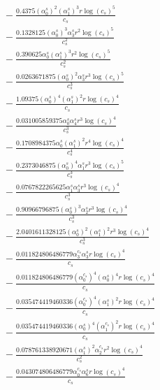 \documentclass[10pt]{article}
\begin{document}
\begin{align*}
&{}  - \frac{0.4375 \left(\alpha_{0}^s\right)^{2} \left(\alpha_{1}^s\right)^{3} r \log{\left(c_{s} \right)}^{5}}{c_{s}} \\
&{}  - \frac{0.1328125 \left(\alpha_{0}^s\right)^{3} \alpha_{3}^s r^{2} \log{\left(c_{s} \right)}^{5}}{c_{s}^{2}} \\
&{}  - \frac{0.390625 \alpha_{0}^s \left(\alpha_{1}^s\right)^{3} r^{2} \log{\left(c_{s} \right)}^{5}}{c_{s}^{2}} \\
&{}  - \frac{0.0263671875 \left(\alpha_{0}^s\right)^{2} \alpha_{3}^s r^{3} \log{\left(c_{s} \right)}^{5}}{c_{s}^{3}} \\
&{}  - \frac{1.09375 \left(\alpha_{0}^s\right)^{4} \left(\alpha_{1}^s\right)^{2} r \log{\left(c_{s} \right)}^{4}}{c_{s}} \\
&{}  - \frac{0.031005859375 \alpha_{0}^s \alpha_{4}^s r^{3} \log{\left(c_{s} \right)}^{4}}{c_{s}^{3}} \\
&{}  - \frac{0.1708984375 \alpha_{0}^s \left(\alpha_{1}^s\right)^{2} r^{4} \log{\left(c_{s} \right)}^{4}}{c_{s}^{4}} \\
&{}  - \frac{0.2373046875 \left(\alpha_{0}^s\right)^{4} \alpha_{1}^s r^{3} \log{\left(c_{s} \right)}^{5}}{c_{s}^{3}} \\
&{}  - \frac{0.0767822265625 \alpha_{1}^s \alpha_{3}^s r^{3} \log{\left(c_{s} \right)}^{4}}{c_{s}^{3}} \\
&{}  - \frac{0.90966796875 \left(\alpha_{0}^s\right)^{3} \alpha_{2}^s r^{3} \log{\left(c_{s} \right)}^{4}}{c_{s}^{3}} \\
&{}  - \frac{2.0401611328125 \left(\alpha_{0}^s\right)^{2} \left(\alpha_{1}^s\right)^{2} r^{3} \log{\left(c_{s} \right)}^{4}}{c_{s}^{3}} \\
&{}  - \frac{0.011824806486779 \alpha_{3}^{c_s} \alpha_{3}^s r \log{\left(c_{s} \right)}^{4}}{c_{s}} \\
&{}  - \frac{0.011824806486779 \left(\alpha_{0}^{c_s}\right)^{4} \left(\alpha_{0}^s\right)^{4} r \log{\left(c_{s} \right)}^{4}}{c_{s}} \\
&{}  - \frac{0.035474419460336 \left(\alpha_{0}^{c_s}\right)^{4} \left(\alpha_{1}^s\right)^{2} r \log{\left(c_{s} \right)}^{4}}{c_{s}} \\
&{}  - \frac{0.035474419460336 \left(\alpha_{0}^s\right)^{4} \left(\alpha_{1}^{c_s}\right)^{2} r \log{\left(c_{s} \right)}^{4}}{c_{s}} \\
&{}  - \frac{0.078761338920671 \left(\alpha_{1}^s\right)^{2} \alpha_{2}^{c_s} r^{2} \log{\left(c_{s} \right)}^{4}}{c_{s}^{2}} \\
&{}  - \frac{0.043074806486779 \alpha_{0}^{c_s} \alpha_{6}^s r \log{\left(c_{s} \right)}^{4}}{c_{s}} \\

\end{align*}
\end{document}
